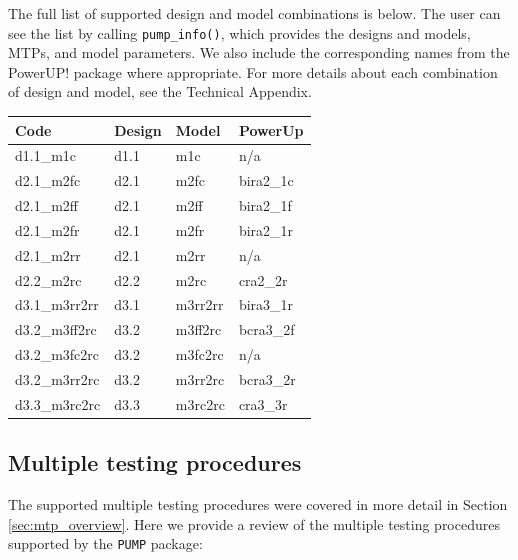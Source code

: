 \documentclass[
]{article}
\begin{document}
The full list of supported design and model combinations is below. The
user can see the list by calling \texttt{pump\_info()}, which provides
the designs and models, MTPs, and model parameters. We also include the
corresponding names from the PowerUP! package where appropriate. For
more details about each combination of design and model, see the
Technical Appendix.

\begin{table}
\centering
\begin{tabular}{llll}
\toprule
Code & Design & Model & PowerUp\\
\midrule
d1.1\_m1c & d1.1 & m1c & n/a\\
d2.1\_m2fc & d2.1 & m2fc & bira2\_1c\\
d2.1\_m2ff & d2.1 & m2ff & bira2\_1f\\
d2.1\_m2fr & d2.1 & m2fr & bira2\_1r\\
d2.1\_m2rr & d2.1 & m2rr & n/a\\
\addlinespace
d2.2\_m2rc & d2.2 & m2rc & cra2\_2r\\
d3.1\_m3rr2rr & d3.1 & m3rr2rr & bira3\_1r\\
d3.2\_m3ff2rc & d3.2 & m3ff2rc & bcra3\_2f\\
d3.2\_m3fc2rc & d3.2 & m3fc2rc & n/a\\
d3.2\_m3rr2rc & d3.2 & m3rr2rc & bcra3\_2r\\
\addlinespace
d3.3\_m3rc2rc & d3.3 & m3rc2rc & cra3\_3r\\
\bottomrule
\end{tabular}
\end{table}

\subsection{Multiple testing procedures}

The supported multiple testing procedures were covered in more detail in
Section \ref{sec:mtp_overview}. Here we provide a review of the multiple
testing procedures supported by the \texttt{PUMP} package:
\end{document}
